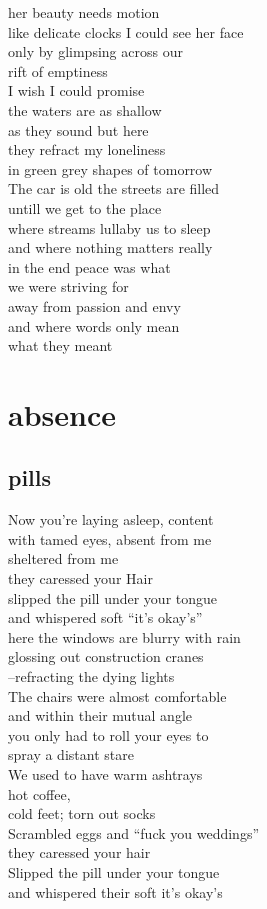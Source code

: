 \documentclass{article}
\begin{document}
her beauty needs  motion\\
like delicate clocks I could see her face\\
only by glimpsing across our\\
rift of emptiness\\
I wish I could promise\\
the waters are as shallow\\
as they sound but here\\
they refract my loneliness\\
in green grey shapes of tomorrow\\

The car is old the streets are filled\\
untill we get to the place\\
where streams lullaby us to sleep\\
and where nothing matters really\\
in the end peace was what\\
we were striving for\\
away from passion and envy\\
and where words only mean\\
what they meant
\clearpage

\section{absence}
\subsection{pills}

Now you're laying asleep, content\\
with tamed eyes, absent from me\\
sheltered from me\\
they caressed your Hair\\
slipped the pill under your tongue\\
and whispered soft ``it's okay's''\\
here the windows are blurry with rain\\
glossing out construction cranes\\
--refracting the dying lights\\

The chairs were almost comfortable\\
and within their mutual angle\\
you only had to roll your eyes to\\
spray a distant stare\\
We used to have warm ashtrays\\
hot coffee,\\
cold feet; torn out socks\\
Scrambled eggs and ``fuck you weddings''\\
they caressed your hair\\
Slipped the pill under your tongue\\
and whispered their soft it's  okay's\\
\end{document}
